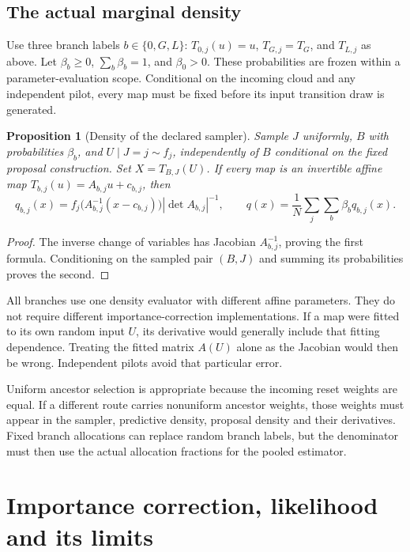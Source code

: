 \documentclass[11pt,a4paper]{article}
\newtheorem{proposition}{Proposition}[section]
\begin{document}
\subsection{The actual marginal density}

Use three branch labels \(b\in\{0,G,L\}\):
\(T_{0,j}(u)=u\), \(T_{G,j}=T_G\), and \(T_{L,j}\) as above.
Let \(\beta_b\geq0\), \(\sum_b\beta_b=1\), and \(\beta_0>0\).
These probabilities are frozen within a parameter-evaluation scope.
Conditional on the incoming cloud and any independent pilot, every map
must be fixed before its input transition draw is generated.

\begin{proposition}[Density of the declared sampler]
Sample \(J\) uniformly, \(B\) with probabilities \(\beta_b\), and
\(U\mid J=j\sim f_j\), independently of \(B\) conditional on the fixed
proposal construction. Set \(X=T_{B,J}(U)\). If every map is an invertible
affine map \(T_{b,j}(u)=A_{b,j}u+c_{b,j}\), then
\begin{equation}
\label{eq:mapped-density}
 q_{b,j}(x)=
 f_j\bigl(A_{b,j}^{-1}(x-c_{b,j})\bigr)
 |\det A_{b,j}|^{-1},\qquad
 q(x)=\frac1N\sum_j\sum_b\beta_b q_{b,j}(x).
\end{equation}
\end{proposition}
\begin{proof}
The inverse change of variables has Jacobian \(A_{b,j}^{-1}\), proving
the first formula. Conditioning on the sampled pair \((B,J)\) and summing
its probabilities proves the second.
\end{proof}

All branches use one density evaluator with different affine parameters.
They do not require different importance-correction implementations.
If a map were fitted to its own random input \(U\), its derivative would
generally include that fitting dependence. Treating the fitted matrix
\(A(U)\) alone as the Jacobian would then be wrong. Independent pilots
avoid that particular error.

Uniform ancestor selection is appropriate because the incoming reset
weights are equal. If a different route carries nonuniform ancestor
weights, those weights must appear in the sampler, predictive density,
proposal density and their derivatives. Fixed branch allocations can
replace random branch labels, but the denominator must then use the
actual allocation fractions for the pooled estimator.

\section{Importance correction, likelihood and its limits}
\end{document}
